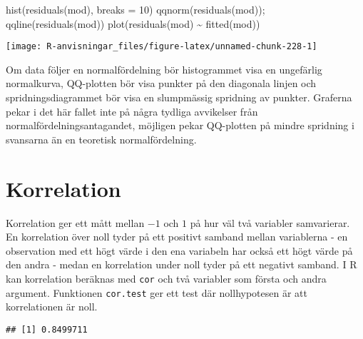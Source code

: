 \documentclass[
]{book}
\newenvironment{Shaded}{\begin{snugshade}}{\end{snugshade}}
\newcommand{\AttributeTok}[1]{\textcolor[rgb]{0.77,0.63,0.00}{#1}}
\newcommand{\DecValTok}[1]{\textcolor[rgb]{0.00,0.00,0.81}{#1}}
\newcommand{\FunctionTok}[1]{\textcolor[rgb]{0.00,0.00,0.00}{#1}}
\newcommand{\NormalTok}[1]{#1}
\newcommand{\SpecialCharTok}[1]{\textcolor[rgb]{0.00,0.00,0.00}{#1}}
\theoremstyle{definition}
\theoremstyle{definition}
\theoremstyle{definition}
\theoremstyle{definition}
\theoremstyle{remark}
\begin{document}
\begin{Shaded}
\begin{Highlighting}[]
\FunctionTok{hist}\NormalTok{(}\FunctionTok{residuals}\NormalTok{(mod), }\AttributeTok{breaks =} \DecValTok{10}\NormalTok{)}
\FunctionTok{qqnorm}\NormalTok{(}\FunctionTok{residuals}\NormalTok{(mod)); }\FunctionTok{qqline}\NormalTok{(}\FunctionTok{residuals}\NormalTok{(mod))}
\FunctionTok{plot}\NormalTok{(}\FunctionTok{residuals}\NormalTok{(mod) }\SpecialCharTok{\textasciitilde{}} \FunctionTok{fitted}\NormalTok{(mod))}
\end{Highlighting}
\end{Shaded}

\begin{center}\texttt{[image: R-anvisningar\_files/figure-latex/unnamed-chunk-228-1]} \end{center}

Om data följer en normalfördelning bör histogrammet visa en ungefärlig normalkurva, QQ-plotten bör visa punkter på den diagonala linjen och spridningsdiagrammet bör visa en slumpmässig spridning av punkter. Graferna pekar i det här fallet inte på några tydliga avvikelser från normalfördelningsantagandet, möjligen pekar QQ-plotten på mindre spridning i svansarna än en teoretisk normalfördelning.

\hypertarget{korrelation}{%
\section{Korrelation}\label{korrelation}}

Korrelation ger ett mått mellan \(-1\) och \(1\) på hur väl två variabler samvarierar. En korrelation över noll tyder på ett positivt samband mellan variablerna - en observation med ett högt värde i den ena variabeln har också ett högt värde på den andra - medan en korrelation under noll tyder på ett negativt samband. I R kan korrelation beräknas med \texttt{cor} och två variabler som första och andra argument. Funktionen \texttt{cor.test} ger ett test där nollhypotesen är att korrelationen är noll.

\begin{Shaded}
\end{Shaded}

\begin{verbatim}
## [1] 0.8499711
\end{verbatim}
\end{document}
